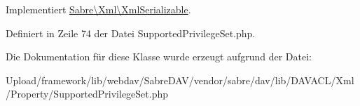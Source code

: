 Implementiert \mbox{\hyperlink{interface_sabre_1_1_xml_1_1_xml_serializable_aa78f3ee43aa699be8347181653a53d8c}{Sabre\textbackslash{}\+Xml\textbackslash{}\+Xml\+Serializable}}.



Definiert in Zeile 74 der Datei Supported\+Privilege\+Set.\+php.



Die Dokumentation für diese Klasse wurde erzeugt aufgrund der Datei\+:\begin{DoxyCompactItemize}
\item 
Upload/framework/lib/webdav/\+Sabre\+D\+A\+V/vendor/sabre/dav/lib/\+D\+A\+V\+A\+C\+L/\+Xml/\+Property/Supported\+Privilege\+Set.\+php\end{DoxyCompactItemize}

